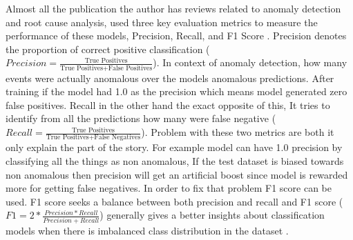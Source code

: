 Almost all the publication the author has reviews related to anomaly detection and root cause analysis, used three key evaluation metrics to measure the performance of these models, Precision, Recall, and F1 Score \citep{buckland1994relationship}. Precision denotes the proportion of correct positive classification (\( Precision = \frac{\text{True Positives}}{\text{True Positives} + \text{False Positives}} \)). In context of anomaly detection, how many events were actually anomalous over the models anomalous predictions. After training if the model had 1.0 as the precision which means model generated zero false positives. Recall in the other hand the exact opposite of this, It tries to identify from all the predictions how many were false negative (\( Recall = \frac{\text{True Positives}}{\text{True Positives} + \text{False Negatives}} \)). Problem with these two metrics are both it only explain the part of the story. For example model can have 1.0 precision by classifying all the things as non anomalous, If the test dataset is biased towards non anomalous then precision will get an artificial boost since model is rewarded more for getting false negatives. In order to fix that problem F1 score can be used. F1 score seeks a balance between both precision and recall and F1 score (\( F1 = 2*\frac{Precision*Recall}{Precision+Recall} \)) generally gives a better insights about classification models when there is imbalanced class distribution in the dataset \citep{Accuracy18:online}.
